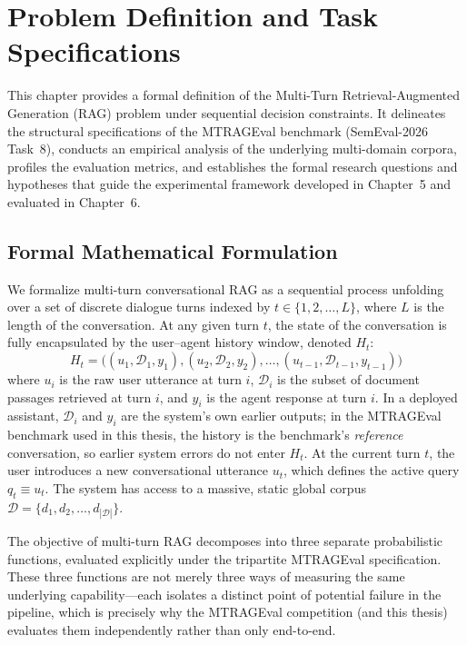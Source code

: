 \chapter{Problem Definition and Task Specifications}
\label{chapter:problem}

This chapter provides a formal definition of the Multi-Turn Retrieval-Augmented Generation (RAG) problem under sequential decision constraints. It delineates the structural specifications of the MTRAGEval benchmark (SemEval-2026 Task~8), conducts an empirical analysis of the underlying multi-domain corpora, profiles the evaluation metrics, and establishes the formal research questions and hypotheses that guide the experimental framework developed in Chapter~5 and evaluated in Chapter~6.

\section{Formal Mathematical Formulation}
\label{sec:formal-formulation}

We formalize multi-turn conversational RAG as a sequential process unfolding over a set of discrete dialogue turns indexed by $t \in \{1, 2, \dots, L\}$, where $L$ is the length of the conversation. At any given turn $t$, the state of the conversation is fully encapsulated by the user--agent history window, denoted $H_t$:
\begin{equation}
H_t = \Big( (u_1, \mathcal{D}_1, y_1), (u_2, \mathcal{D}_2, y_2), \dots, (u_{t-1}, \mathcal{D}_{t-1}, y_{t-1}) \Big)
\end{equation}
where $u_i$ is the raw user utterance at turn $i$, $\mathcal{D}_i$ is the subset of document passages retrieved at turn $i$, and $y_i$ is the agent response at turn $i$. In a deployed assistant, $\mathcal{D}_i$ and $y_i$ are the system's own earlier outputs; in the MTRAGEval benchmark used in this thesis, the history is the benchmark's \emph{reference} conversation, so earlier system errors do not enter $H_t$. At the current turn $t$, the user introduces a new conversational utterance $u_t$, which defines the active query $q_t \equiv u_t$. The system has access to a massive, static global corpus $\mathcal{D} = \{d_1, d_2, \dots, d_{|\mathcal{D}|}\}$.

The objective of multi-turn RAG decomposes into three separate probabilistic functions, evaluated explicitly under the tripartite MTRAGEval specification. These three functions are not merely three ways of measuring the same underlying capability---each isolates a distinct point of potential failure in the pipeline, which is precisely why the MTRAGEval competition (and this thesis) evaluates them independently rather than only end-to-end.

